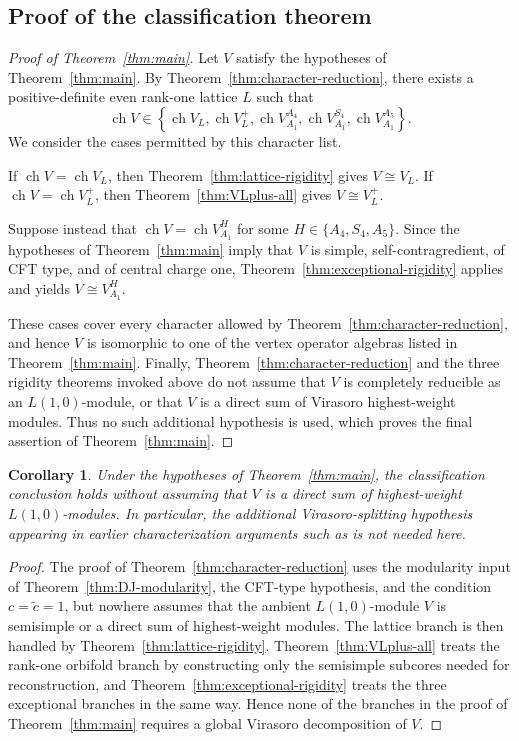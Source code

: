 \documentclass[12pt,leqno]{amsart}
\numberwithin{equation}{section} \newtheorem{thm}{Theorem}[section] \newtheorem{lem}[thm]{Lemma} \newtheorem{ex}[thm]{Example} \newtheorem{prop}[thm]{Proposition} \newtheorem{cor}[thm]{Corollary} \newtheorem{defi}[thm]{Definition} \newtheorem{rmk}[thm]{Remark} \newtheorem{notation}[thm]{Notation}
\newcommand{\ch}{\operatorname{ch}}
\begin{document}
\subsection{Proof of the classification theorem}

\begin{proof}[Proof of Theorem~\ref{thm:main}]
Let $V$ satisfy the hypotheses of Theorem~\ref{thm:main}. By Theorem~\ref{thm:character-reduction}, there exists a positive-definite even rank-one lattice $L$ such that
\[
\ch V\in\left\{\ch V_L,\ch V_L^+,\ch V_{A_1}^{A_4},\ch V_{A_1}^{S_4},\ch V_{A_1}^{A_5}\right\}.
\] We consider the cases permitted by this character list.

If \(\ch V=\ch V_L\), then Theorem~\ref{thm:lattice-rigidity} gives \(V\cong V_L\). If \(\ch V=\ch V_L^+\), then Theorem~\ref{thm:VLplus-all} gives \(V\cong V_L^+\).

Suppose instead that \(\ch V=\ch V_{A_1}^{H}\) for some \(H\in\{A_4,S_4,A_5\}\). Since the hypotheses of Theorem~\ref{thm:main} imply that $V$ is simple, self-contragredient, of CFT type, and of central charge one, Theorem~\ref{thm:exceptional-rigidity} applies and yields \(V\cong V_{A_1}^{H}\).

These cases cover every character allowed by Theorem~\ref{thm:character-reduction}, and hence $V$ is isomorphic to one of the vertex operator algebras listed in Theorem~\ref{thm:main}. Finally, Theorem~\ref{thm:character-reduction} and the three rigidity theorems invoked above do not assume that $V$ is completely reducible as an $L(1,0)$-module, or that $V$ is a direct sum of Virasoro highest-weight modules. Thus no such additional hypothesis is used, which proves the final assertion of Theorem~\ref{thm:main}.
\end{proof}

\begin{cor}\label{cor:no-Vir-splitting}
Under the hypotheses of Theorem~\ref{thm:main}, the classification conclusion holds without assuming that $V$ is a direct sum of highest-weight $L(1,0)$-modules. In particular, the additional Virasoro-splitting hypothesis appearing in earlier characterization arguments such as \cite{DJplusI,DJplusII,DJA4} is not needed here.
\end{cor}

\begin{proof}
The proof of Theorem~\ref{thm:character-reduction} uses the modularity input of Theorem~\ref{thm:DJ-modularity}, the CFT-type hypothesis, and the condition $c=\widetilde c=1$, but nowhere assumes that the ambient $L(1,0)$-module $V$ is semisimple or a direct sum of highest-weight modules. The lattice branch is then handled by Theorem~\ref{thm:lattice-rigidity}. Theorem~\ref{thm:VLplus-all} treats the rank-one orbifold branch by constructing only the semisimple subcores needed for reconstruction, and Theorem~\ref{thm:exceptional-rigidity} treats the three exceptional branches in the same way. Hence none of the branches in the proof of Theorem~\ref{thm:main} requires a global Virasoro decomposition of $V$.
\end{proof}
\end{document}
